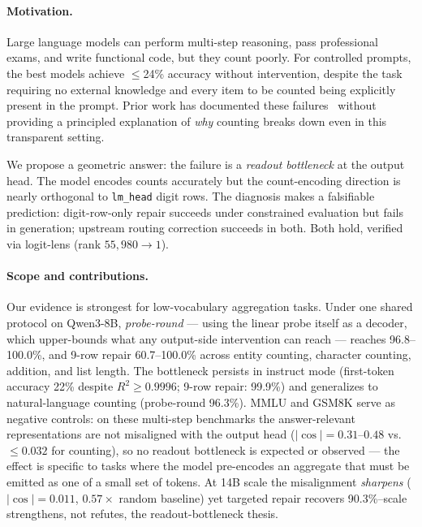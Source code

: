 \documentclass{article}
\begin{document}
\paragraph{Motivation.}
Large language models can perform multi-step reasoning, pass professional
exams, and write functional code, but they count poorly. For controlled prompts,
the best models achieve $\leq$24\% accuracy without intervention, despite the
task requiring no external knowledge and every item to be counted being
explicitly present in the prompt. Prior work has documented these
failures~\citep{razeghi2022impact,stolfo2023mechanistic} without providing a
principled explanation of \emph{why} counting breaks down even in this
transparent setting.

We propose a geometric answer: the failure is a \emph{readout bottleneck} at the
output head. The model encodes counts accurately but the count-encoding
direction is nearly orthogonal to \texttt{lm\_head} digit rows. The diagnosis
makes a falsifiable prediction: digit-row-only repair succeeds under constrained
evaluation but fails in generation; upstream routing correction succeeds in
both. Both hold, verified via logit-lens (rank $55{,}980{\to}1$).

\paragraph{Scope and contributions.}
Our evidence is strongest for low-vocabulary aggregation tasks. Under one shared
protocol on Qwen3-8B, \emph{probe-round} --- using the linear probe itself as a
decoder, which upper-bounds what any output-side intervention can reach ---
reaches 96.8--100.0\%, and 9-row repair
60.7--100.0\% across entity counting, character counting, addition, and list
length. The bottleneck persists in instruct mode (first-token accuracy 22\%
despite $R^2 \geq 0.9996$; 9-row repair: 99.9\%) and generalizes to
natural-language counting (probe-round 96.3\%). MMLU and GSM8K serve as
negative controls: on these multi-step benchmarks the answer-relevant
representations are not misaligned with the output head ($|\cos| =
0.31$--$0.48$ vs.\ $\leq 0.032$ for counting), so no readout bottleneck is
expected or observed --- the effect is specific to tasks where the model
pre-encodes an aggregate that must be emitted as one of a small set of tokens.
At 14B scale the misalignment
\emph{sharpens} ($|\cos|{=}0.011$, $0.57\times$ random baseline) yet targeted
repair recovers 90.3\%\---scale strengthens, not refutes, the readout-bottleneck
thesis.
\end{document}
